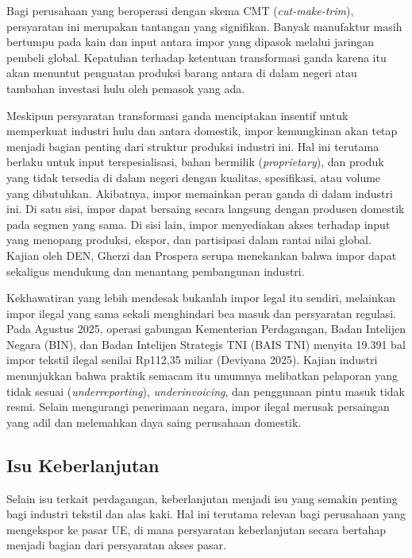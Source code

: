 \documentclass[
  manuscript=article,
  layout=publish,
  year=2026,
  volume=1,
]{den}
\begin{document}
Bagi perusahaan yang beroperasi dengan skema CMT (\emph{cut-make-trim}),
persyaratan ini merupakan tantangan yang signifikan. Banyak manufaktur
masih bertumpu pada kain dan input antara impor yang dipasok melalui
jaringan pembeli global. Kepatuhan terhadap ketentuan transformasi ganda
karena itu akan menuntut penguatan produksi barang antara di dalam
negeri atau tambahan investasi hulu oleh pemasok yang ada.

Meskipun persyaratan transformasi ganda menciptakan insentif untuk
memperkuat industri hulu dan antara domestik, impor kemungkinan akan
tetap menjadi bagian penting dari struktur produksi industri ini. Hal
ini terutama berlaku untuk input terspesialisasi, bahan bermilik
(\emph{proprietary}), dan produk yang tidak tersedia di dalam negeri
dengan kualitas, spesifikasi, atau volume yang dibutuhkan. Akibatnya,
impor memainkan peran ganda di dalam industri ini. Di satu sisi, impor
dapat bersaing secara langsung dengan produsen domestik pada segmen yang
sama. Di sisi lain, impor menyediakan akses terhadap input yang menopang
produksi, ekspor, dan partisipasi dalam rantai nilai global. Kajian oleh
DEN, Gherzi dan Prospera serupa menekankan bahwa impor dapat sekaligus
mendukung dan menantang pembangunan industri.

Kekhawatiran yang lebih mendesak bukanlah impor legal itu sendiri,
melainkan impor ilegal yang sama sekali menghindari bea masuk dan
persyaratan regulasi. Pada Agustus 2025, operasi gabungan Kementerian
Perdagangan, Badan Intelijen Negara (BIN), dan Badan Intelijen Strategis
TNI (BAIS TNI) menyita 19.391 bal impor tekstil ilegal senilai Rp112,35
miliar (Deviyana 2025). Kajian industri menunjukkan bahwa praktik
semacam itu umumnya melibatkan pelaporan yang tidak sesuai
(\emph{underreporting}), \emph{underinvoicing}, dan penggunaan pintu
masuk tidak resmi. Selain mengurangi penerimaan negara, impor ilegal
merusak persaingan yang adil dan melemahkan daya saing perusahaan
domestik.

\subsection{Isu Keberlanjutan}\label{isu-keberlanjutan}

Selain isu terkait perdagangan, keberlanjutan menjadi isu yang semakin
penting bagi industri tekstil dan alas kaki. Hal ini terutama relevan
bagi perusahaan yang mengekspor ke pasar UE, di mana persyaratan
keberlanjutan secara bertahap menjadi bagian dari persyaratan akses
pasar.
\end{document}
